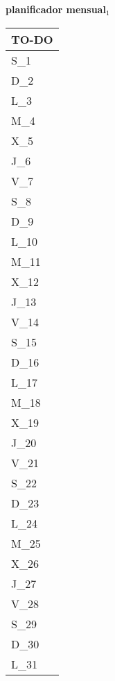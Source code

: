 \clearpage
\raggedright{
	\fontsize{25}{50}\selectfont
	\textbf{\NextYear}
}\scriptsize{\textbf{planificador mensual$_1$}}\\[11.3pt]



	\noindent\dotfill
	\renewcommand{\arraystretch}{1.5}\scriptsize
		\begin{longtabu} to \textwidth { X[l]}
		\centering \small{\textbf{TO-DO}} \\
		\toprule
		S_{1} \dotfill\\
		D_{2} \dotfill\\
		\hline
		L_{3} \dotfill\\
		M_{4} \dotfill\\
		X_{5} \dotfill\\
		J_{6} \dotfill\\
		V_{7} \dotfill\\
		S_{8} \dotfill\\
		D_{9} \dotfill\\
		\hline
		L_{10} \dotfill\\
		M_{11} \dotfill\\
		X_{12} \dotfill\\
		J_{13} \dotfill\\
		V_{14} \dotfill\\
		S_{15} \dotfill\\
		D_{16} \dotfill\\
		\hline
		L_{17} \dotfill\\
		M_{18} \dotfill\\
		X_{19} \dotfill\\
		J_{20} \dotfill\\
		V_{21} \dotfill\\
		S_{22} \dotfill\\
		D_{23} \dotfill\\
		\hline
		L_{24} \dotfill\\
		M_{25} \dotfill\\
		X_{26} \dotfill\\
		J_{27} \dotfill\\
		V_{28} \dotfill\\
		S_{29} \dotfill\\
		D_{30} \dotfill\\
		\hline
		L_{31} \dotfill\\

		\bottomrule

	\end{longtabu}


\clearpage
